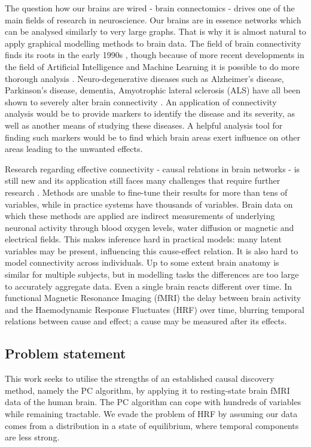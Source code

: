 \documentclass[a4paper, 10pt, english, onecolumn]{article}
\begin{document}
The question how our brains are wired - brain connectomics - drives one of the main fields of research in neuroscience.
Our brains are in essence networks which can be analysed similarly to very large graphs.
That is why it is almost natural to apply graphical modelling methods to brain data.
The field of brain connectivity finds its roots in the early 1990s \cite{friston1993functional, friston1994}, though because of more recent developments in the field of Artificial Intelligence and Machine Learning it is possible to do more thorough analysis \cite{vandenheuvel2010}.
Neuro-degenerative diseases such as Alzheimer's disease, Parkinson's disease, dementia, Amyotrophic lateral sclerosis (ALS) have all been shown to severely alter brain connectivity \cite{Bullmore2009}.
An application of connectivity analysis would be to provide markers to identify the disease and its severity, as well as another means of studying these diseases.
A helpful analysis tool for finding such markers would be to find which brain areas exert influence on other areas leading  to the unwanted effects.

Research regarding effective connectivity - causal relations in brain networks - is still new and its application still faces many challenges that require further research \cite{ramsey2010}.
Methods are unable to fine-tune their results for more than tens of variables, while in practice systems have thousands of variables.
Brain data on which these methods are applied are indirect measurements of underlying neuronal activity through blood oxygen levels, water diffusion or magnetic and electrical fields.
This makes inference hard in practical models: many latent variables may be present, influencing this cause-effect relation.
It is also hard to model connectivity across individuals.
Up to some extent brain anatomy is similar for multiple subjects, but in modelling tasks the differences are too large to accurately aggregate data.
Even a single brain reacts different over time.
In functional Magnetic Resonance Imaging (fMRI) the delay between brain activity and the Haemodynamic Response Fluctuates (HRF) over time, blurring temporal relations between cause and effect; a cause may be measured after its effects.

\subsection{Problem statement}
This work seeks to utilise the strengths of an established causal discovery method, namely the PC algorithm, by applying it to resting-state brain fMRI data of the human brain.
The PC algorithm can cope with hundreds of variables while remaining tractable.
We evade the problem of HRF by assuming our data comes from a distribution in a state of equilibrium, where temporal components are less strong.
\end{document}
